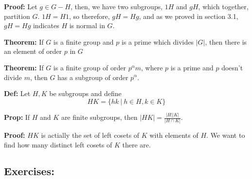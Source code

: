 \documentclass{article}
\begin{document}
\textbf{Proof:} Let $g \in G-H$, then, we have two subgroups, $1H$ and $gH$, which together, partition $G$. $1H = H1$, so therefore, $gH = Hg$, and as we proved in section 3.1, $gH = Hg$ indicates $H$ is normal in $G$. 

\textbf{Theorem:} If $G$ is a finite group and $p$ is a prime which divides $\vert G \vert$, then there is an element of order $p$ in $G$

\textbf{Theorem:} If $G$ is a finite group of order $p^\alpha m$, where $p$ is a prime and $p$ doesn't divide $m$, then $G$ has a subgroup of order $p^\alpha$. 

\textbf{Def:} Let $H,K$ be subgroups and define $$HK = \{hk \ \vert\ h \in H, k\in K \}$$

\textbf{Prop:} If $H$ and $K$ are finite subgroups, then $\vert HK \vert = \frac{\vert H \vert \vert K \vert}{\vert H \cap K\vert}$.

\textbf{Proof:} $HK$ is actially the set of left cosets of $K$ with elements of $H$. We want to find how many distinct left cosets of $K$ there are. 

\subsection{Exercises:}
\end{document}
